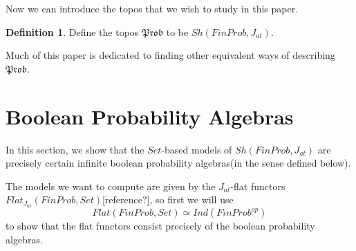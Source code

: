 \documentclass[a4paper]{amsproc}
\theoremstyle{plain}
\theoremstyle{definition}
\newtheorem{definition}{Definition}[section]
\theoremstyle{remark}
\numberwithin{equation}{section}
\begin{document}
Now we can introduce the topos that we wish to study in this paper.

\begin{definition}
Define the topos $\mathfrak{Prob}$ to be $Sh(FinProb, J_{at})$.
\end{definition}

Much of this paper is dedicated to finding other equivalent ways of describing $\mathfrak{Prob}$.

\section{Boolean Probability Algebras}

In this section, we show that the $Set$-based models of $Sh(FinProb, J_{at})$ are precisely certain infinite boolean probability algebras(in the sense defined below).

The models we want to compute are given by the $J_{at}$-flat functors $Flat_{J_{at}}(FinProb, Set)$[reference?], so first we will use 
\[
Flat(FinProb, Set) \simeq Ind(FinProb^{op})
\]
to show that the flat functors consist precisely of the boolean probability algebras.
\end{document}
